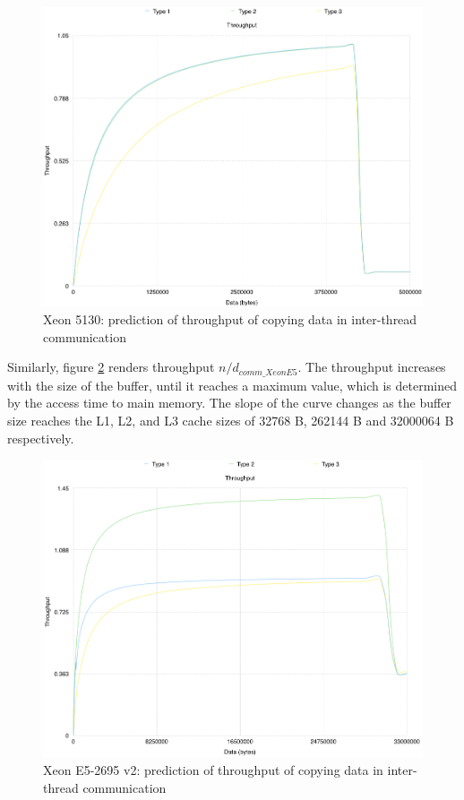\begin{figure}[ht!]
\centering
\includegraphics[width=145mm]{7/graph_model_nuim.png}
\caption{Xeon 5130: prediction of throughput of copying data in inter-thread communication}
\label{graph_model_nuim}
\end{figure}

Similarly, figure \ref{graph_model_ichec} renders throughput $n / d_{comm\_XeonE5}$. The throughput increases with the size of the buffer, until it reaches a maximum value, which is determined by the access time to main memory. The slope of the curve changes as the buffer size reaches the L1, L2, and L3 cache sizes of 32768 B, 262144 B and 32000064 B respectively.

\begin{figure}[ht!]
\centering
\includegraphics[width=145mm]{7/graph_model_ichec.png}
\caption{Xeon E5-2695 v2: prediction of throughput of copying data in inter-thread communication}
\label{graph_model_ichec}
\end{figure}

